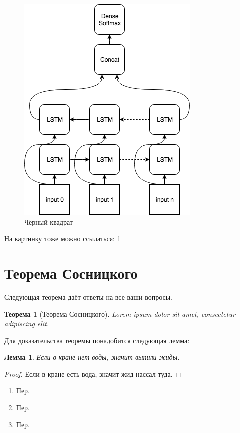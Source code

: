 \documentclass[14pt, a4paper, russian]{report}
\newtheorem{lemma}{\indent Лемма}
\newtheorem{theorem}{\indent Теорема}
\begin{document}
\begin{normalsize}
\begin{figure}[H]
	\begin{center}
		 \includegraphics[width=0.5\linewidth]{Baseline}
	\end{center}
  
    \caption{\footnotesize{Чёрный квадрат}}
\label{fig:square}
\end{figure}

На картинку тоже можно ссылаться: \cref{fig:square}

\section{Теорема Сосницкого}
Следующая теорема даёт ответы на все ваши вопросы.

\begin{theorem}[Теорема Сосницкого]\label{th:sosnitsky}
Lorem ipsum dolor sit amet, consectetur adipiscing elit.
\end{theorem}

Для доказательства теоремы понадобится следующая лемма:

\begin{lemma}\label{le:sosnyakovsky}
Если в кране нет воды, значит выпили жиды.
\end{lemma}
\begin{proof}
Если в кране есть вода, значит жид нассал туда.

\end{proof}

\begin{enumerate}
\item Пер.
\item Пер.
\item Пер.
\end{enumerate}


\end{normalsize}
\end{document}
